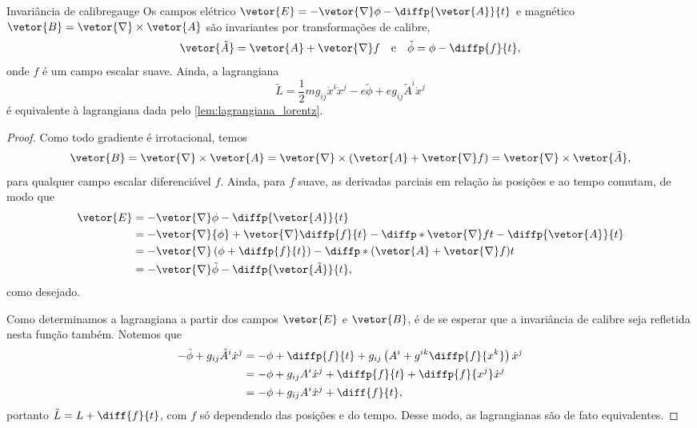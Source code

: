 \begin{lemma}{Invariância de calibre}{gauge}
    Os campos elétrico \(\vetor{E} = - \vetor{\nabla}\phi - \diffp{\vetor{A}}{t}\) e magnético \(\vetor{B} = \vetor{\nabla}\times\vetor{A}\) são invariantes por transformações de calibre,
    \begin{equation*}
        \vetor{\tilde{A}} = \vetor{A} + \vetor{\nabla}f\quad\text{e}\quad\tilde{\phi} = \phi - \diffp{f}{t},
    \end{equation*}
    onde \(f\) é um campo escalar suave. Ainda, a lagrangiana
    \begin{equation*}
        \tilde{L} = \frac12 mg_{ij} \dot{x}^i\dot{x}^j - e\tilde{\phi} + e g_{ij} \tilde{A}^i \dot{x}^j
    \end{equation*}
    é equivalente à lagrangiana dada pelo \cref{lem:lagrangiana_lorentz}.
\end{lemma}
\begin{proof}
    Como todo gradiente é irrotacional, temos
    \begin{equation*}
        \vetor{B} = \vetor{\nabla}\times \vetor{A} = \vetor{\nabla}\times\left(\vetor{A} + \vetor{\nabla}f\right) = \vetor{\nabla}\times\vetor{\tilde{A}},
    \end{equation*}
    para qualquer campo escalar diferenciável \(f\). Ainda, para \(f\) suave, as derivadas parciais em relação às posições e ao tempo comutam, de modo que
    \begin{align*}
        \vetor{E} &= -\vetor{\nabla}\phi - \diffp{\vetor{A}}{t}\\
                  &= - \vetor{\nabla}{\phi} + \vetor{\nabla}\diffp{f}{t} - \diffp*{\vetor{\nabla}f}{t} - \diffp{\vetor{A}}{t}\\
                  &= - \vetor{\nabla}\left(\phi + \diffp{f}{t}\right) - \diffp*{\left(\vetor{A} + \vetor{\nabla}f\right)}{t}\\
                  &= -\vetor{\nabla}\tilde{\phi} - \diffp{\vetor{\tilde{A}}}{t},
    \end{align*}
    como desejado.

    Como determinamos a lagrangiana a partir dos campos \(\vetor{E}\) e \(\vetor{B}\), é de se esperar que a invariância de calibre seja refletida nesta função também. Notemos que
    \begin{align*}
        -\tilde{\phi} + g_{ij} \tilde{A}^i \dot{x}^j &= -\phi + \diffp{f}{t} + g_{ij}\left(A^i + g^{ik}\diffp{f}{x^k}\right)\dot{x}^j\\
                                                     &= -\phi + g_{ij}A^i\dot{x}^j + \diffp{f}{t} + \diffp{f}{x^j}\dot{x}^j\\
                                                     &= - \phi + g_{ij}A^i\dot{x}^j + \diff{f}{t},
    \end{align*}
    portanto \(\tilde{L} = L + \diff{f}{t}\), com \(f\) só dependendo das posições e do tempo. Desse modo, as lagrangianas são de fato equivalentes.
\end{proof}


